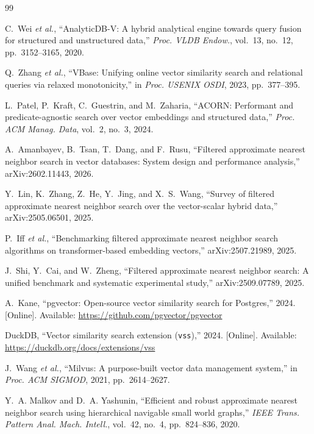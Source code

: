 \documentclass[sigconf,nonacm]{acmart}
\begin{document}
\begin{thebibliography}{99}

C.~Wei \emph{et al.}, ``AnalyticDB-V: A hybrid analytical engine towards query fusion for structured and unstructured data,'' \emph{Proc. VLDB Endow.}, vol.~13, no.~12, pp.~3152--3165, 2020.

Q.~Zhang \emph{et al.}, ``VBase: Unifying online vector similarity search and relational queries via relaxed monotonicity,'' in \emph{Proc. USENIX OSDI}, 2023, pp.~377--395.

L.~Patel, P.~Kraft, C.~Guestrin, and M.~Zaharia, ``ACORN: Performant and predicate-agnostic search over vector embeddings and structured data,'' \emph{Proc. ACM Manag. Data}, vol.~2, no.~3, 2024.

A.~Amanbayev, B.~Tsan, T.~Dang, and F.~Rusu, ``Filtered approximate nearest neighbor search in vector databases: System design and performance analysis,'' arXiv:2602.11443, 2026.

Y.~Lin, K.~Zhang, Z.~He, Y.~Jing, and X.~S.~Wang, ``Survey of filtered approximate nearest neighbor search over the vector-scalar hybrid data,'' arXiv:2505.06501, 2025.

P.~Iff \emph{et al.}, ``Benchmarking filtered approximate nearest neighbor search algorithms on transformer-based embedding vectors,'' arXiv:2507.21989, 2025.

J.~Shi, Y.~Cai, and W.~Zheng, ``Filtered approximate nearest neighbor search: A unified benchmark and systematic experimental study,'' arXiv:2509.07789, 2025.

A.~Kane, ``pgvector: Open-source vector similarity search for Postgres,'' 2024. [Online]. Available: \url{https://github.com/pgvector/pgvector}

DuckDB, ``Vector similarity search extension (\texttt{vss}),'' 2024. [Online]. Available: \url{https://duckdb.org/docs/extensions/vss}

J.~Wang \emph{et al.}, ``Milvus: A purpose-built vector data management system,'' in \emph{Proc. ACM SIGMOD}, 2021, pp.~2614--2627.

Y.~A. Malkov and D.~A. Yashunin, ``Efficient and robust approximate nearest neighbor search using hierarchical navigable small world graphs,'' \emph{IEEE Trans. Pattern Anal. Mach. Intell.}, vol.~42, no.~4, pp.~824--836, 2020.


\end{thebibliography}
\end{document}
